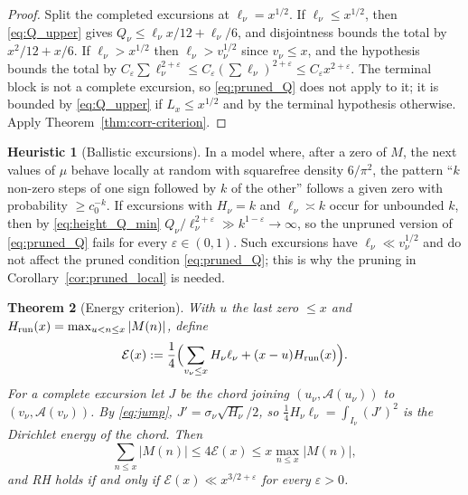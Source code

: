 \documentclass[11pt]{amsart}
\numberwithin{equation}{section}
\theoremstyle{plain}
\newtheorem{theorem}{Theorem}[section]
\theoremstyle{definition}
\newtheorem{heuristic}[theorem]{Heuristic}
\theoremstyle{remark}
\newcommand{\Anet}{\mathcal{A}}
\newcommand{\eps}{\varepsilon}
\newcommand{\En}{\mathcal{E}}
\begin{document}
\begin{proof}
Split the completed excursions at $\ell_\nu=x^{1/2}$. If
$\ell_\nu\le x^{1/2}$, then \eqref{eq:Q_upper} gives
$Q_\nu\le\ell_\nu x/12+\ell_\nu/6$, and disjointness bounds the total by
$x^2/12+x/6$. If $\ell_\nu>x^{1/2}$ then $\ell_\nu>v_\nu^{1/2}$ since
$v_\nu\le x$, and the hypothesis bounds the total by
$C_\eps\sum\ell_\nu^{2+\eps}\le C_\eps(\sum\ell_\nu)^{2+\eps}\le C_\eps x^{2+\eps}$.
The terminal block is not a complete excursion, so \eqref{eq:pruned_Q} does
not apply to it; it is bounded by \eqref{eq:Q_upper} if $L_x\le x^{1/2}$
and by the terminal hypothesis otherwise. Apply Theorem~\ref{thm:corr-criterion}.
\end{proof}

\begin{heuristic}[Ballistic excursions]
\label{heu:local_fails}
In a model where, after a zero of $M$, the next values of $\mu$ behave
locally at random with squarefree density $6/\pi^2$, the pattern ``$k$
non-zero steps of one sign followed by $k$ of the other'' follows a given
zero with probability $\ge c_0^{-k}$. If excursions with $H_\nu=k$ and
$\ell_\nu\asymp k$ occur for unbounded $k$, then by \eqref{eq:height_Q_min}
$Q_\nu/\ell_\nu^{2+\eps}\gg k^{1-\eps}\to\infty$, so the unpruned version of
\eqref{eq:pruned_Q} fails for every $\eps\in(0,1)$. Such excursions have
$\ell_\nu\ll v_\nu^{1/2}$ and do not affect the pruned condition
\eqref{eq:pruned_Q}; this is why the pruning in
Corollary~\ref{cor:pruned_local} is needed.
\end{heuristic}

\begin{theorem}[Energy criterion]
\label{thm:energy}
With $u$ the last zero $\le x$ and $H_{\rm run}(x)=\max_{u<n\le x}|M(n)|$,
define
\begin{equation}
\label{eq:energy_def}
  \En(x):=\frac14\Bigl(\sum_{v_\nu\le x}H_\nu\ell_\nu+(x-u)H_{\rm run}(x)\Bigr).
\end{equation}
For a complete excursion let $J$ be the chord joining
$(u_\nu,\Anet(u_\nu))$ to $(v_\nu,\Anet(v_\nu))$. By \eqref{eq:jump},
$J'=\sigma_\nu\sqrt{H_\nu}/2$, so $\tfrac14H_\nu\ell_\nu=\int_{I_\nu}(J')^2$
is the Dirichlet energy of the chord. Then
\begin{equation}
\label{eq:energy_sandwich}
  \sum_{n\le x}|M(n)|\le4\En(x)\le x\max_{n\le x}|M(n)|,
\end{equation}
and RH holds if and only if $\En(x)\ll x^{3/2+\eps}$ for every $\eps>0$.
\end{theorem}
\end{document}
